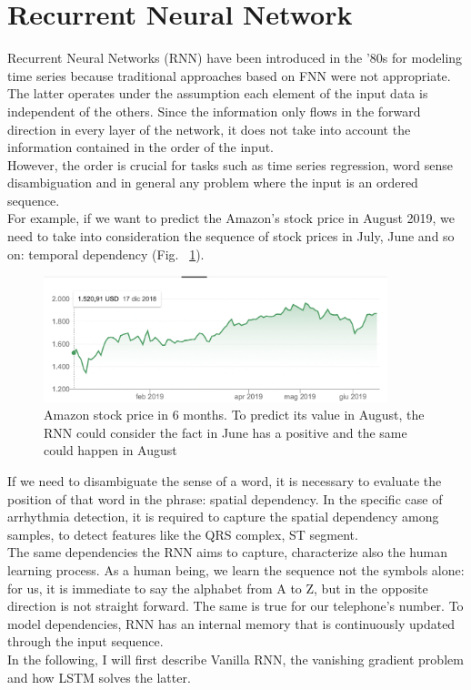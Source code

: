 \documentclass[LaM,binding=0.6cm]{sapthesis}
\begin{document}
\section{Recurrent Neural Network}
Recurrent Neural Networks (RNN) have been introduced in the '80s for modeling time series because traditional approaches based on FNN were not appropriate. The latter operates under the assumption each element of the input data is independent of the others. Since the information only flows in the forward direction in every layer of the network, it does not take into account the information contained in the order of the input.\\However, the order is crucial for tasks such as time series regression, word sense disambiguation and in general any problem where the input is an ordered sequence.\\For example, if we want to predict the Amazon's stock price in August 2019, we need to take into consideration the sequence of stock prices in July, June and so on: temporal dependency (Fig. ~\ref{fig:amzsp}).
\begin{figure}[H]  \centering
    \includegraphics[width=100mm,scale=0.7]{amzsp}
    \caption{Amazon stock price in 6 months. To predict its value in August, the RNN could consider the fact in June has a positive and the same could happen in August}
    \label{fig:amzsp}
\end{figure}

If we need to disambiguate the sense of a word, it is necessary to evaluate the position of that word in the phrase: spatial dependency. In the specific case of arrhythmia detection, it is required to capture the spatial dependency among samples, to detect features like the QRS complex, ST segment.\\The same dependencies the RNN aims to capture, characterize also the human learning process. As a human being, we learn the sequence not the symbols alone: for us, it is immediate to say the alphabet from A to Z, but in the opposite direction is not straight forward. The same is true for our telephone's number. To model dependencies, RNN has an internal memory that is continuously updated through the input sequence.\\ In the following, I will first describe Vanilla RNN, the vanishing gradient problem and how LSTM solves the latter.
\end{document}
